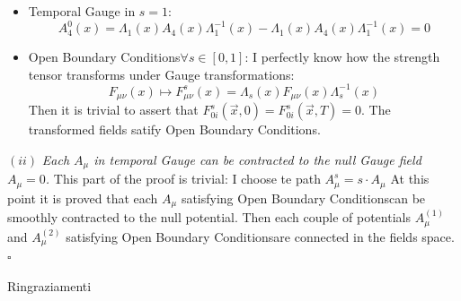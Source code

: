 \documentclass[english, LaM, oneside, noexaminfo]{sapthesis}
\newcommand{\obc}{Open Boundary Conditions}
\newcommand{\proved}{\newline \hspace*{.97\textwidth} $\square$}
\begin{document}
\begin{itemize}
    \item Temporal Gauge in $s=1$: $$A_4^0 (x) = \Lambda_1 (x) A_4 (x) \Lambda_1^{-1} (x) - \Lambda_1 (x) A_4 (x) \Lambda_1^{-1} (x) = 0$$
    \item \obc\space $\forall s \in [0,1]$: I perfectly know how the strength tensor transforms under Gauge transformations:
        $$F_{\mu\nu} (x) \mapsto F_{\mu\nu}^s (x) = \Lambda_s (x) F_{\mu\nu} (x) \Lambda_s^{-1} (x) $$
        Then it is trivial to assert that $F_{0i}^s (\vec x, 0) = F_{0i}^s (\vec x, T) = 0$.
        The transformed fields satify \obc.
\end{itemize}
$(ii)$ \textit{Each $A_\mu$ in temporal Gauge can be contracted to the null Gauge field $A_\mu = 0$.}
\newline
This part of the proof is trivial: I choose te path $A_\mu^s = s\cdot A_\mu$
\newline\newline
At this point it is proved that each $A_\mu$ satisfying \obc\space can be smoothly contracted to the null potential.
Then each couple of potentials $A_\mu^{(1)}$ and $A_\mu^{(2)}$ satisfying \obc\space are connected in the fields space.
\proved





\backmatter
{}
\printbibliography

\begin{acknowledgments}
    Ringraziamenti
\end{acknowledgments}
\end{document}
